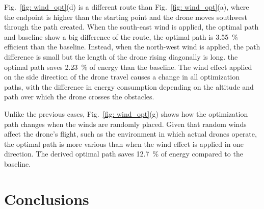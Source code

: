 \documentclass[journal]{./template/IEEEtran}
\begin{document}
Fig.~\ref{fig: wind_opt}(d) is a different route than Fig.~\ref{fig: wind_opt}(a), where the endpoint is higher than the starting point and the drone moves southwest through the path created. When the south-east wind is applied, the optimal path and baseline show a big difference of the route, the optimal path is 3.55~\% efficient than the baseline.
Instead, when the north-west wind is applied, the path difference is small but the length of the drone rising diagonally is long. the optimal path saves 2.23~\% of energy than the baseline.
The wind effect applied on the side direction of the drone travel causes a change in all optimization paths, with the difference in energy consumption depending on the altitude and path over which the drone crosses the obstacles.

Unlike the previous cases, Fig.~\ref{fig: wind_opt}(g) shows how the optimization path changes when the winds are randomly placed.
Given that random winds affect the drone's flight, such as the environment in which actual drones operate, the optimal path is more various than when the wind effect is applied in one direction.
The derived optimal path saves 12.7~\% of energy compared to the baseline.










\section{Conclusions}
\end{document}
